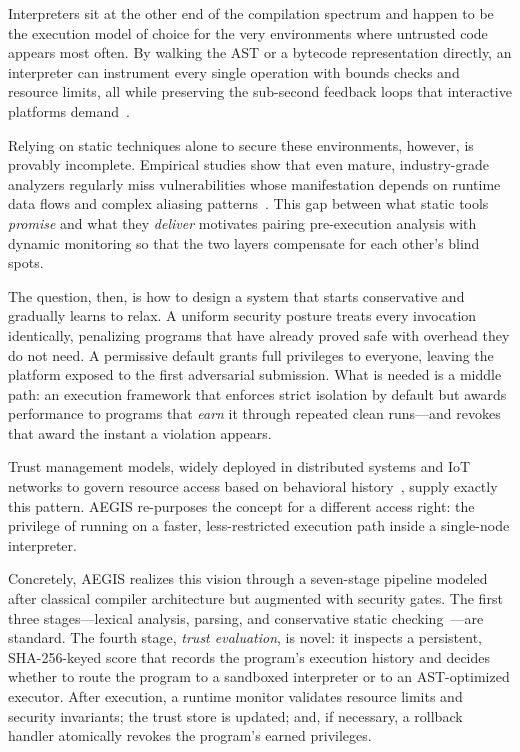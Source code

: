 \documentclass[conference]{IEEEtran}
\begin{document}
Interpreters sit at the other end of the compilation spectrum
and happen to be the execution model of choice for the very
environments where untrusted code appears most often.  By
walking the AST or a bytecode representation directly, an
interpreter can instrument every single operation with bounds
checks and resource limits, all while preserving the
sub-second feedback loops that interactive platforms
demand~\cite{aho2007compilers}.

Relying on static techniques alone to secure these environments,
however, is provably incomplete.  Empirical studies show that
even mature, industry-grade analyzers regularly miss
vulnerabilities whose manifestation depends on runtime data
flows and complex aliasing
patterns~\cite{ami2024false_neg,huang2024static}.  This gap
between what static tools \emph{promise} and what they
\emph{deliver} motivates pairing pre-execution analysis with
dynamic monitoring so that the two layers compensate for each
other's blind spots.

The question, then, is how to design a system that starts
conservative and gradually learns to relax.  A uniform security
posture treats every invocation identically, penalizing programs
that have already proved safe with overhead they do not need.
A permissive default grants full privileges to everyone,
leaving the platform exposed to the first adversarial
submission.  What is needed is a middle path: an execution
framework that enforces strict isolation by default but awards
performance to programs that \emph{earn} it through repeated
clean runs---and revokes that award the instant a violation
appears.

Trust management models, widely deployed in distributed systems
and IoT networks to govern resource access based on behavioral
history~\cite{wang2022trust,li2022iot_trust,ullah2024deeptrust},
supply exactly this pattern.  AEGIS re-purposes the concept for
a different access right: the privilege of running on a faster,
less-restricted execution path inside a single-node interpreter.

Concretely, AEGIS realizes this vision through a seven-stage
pipeline modeled after classical compiler architecture but
augmented with security gates.  The first three stages---lexical
analysis, parsing, and conservative static
checking~\cite{aho2007compilers}---are standard.  The fourth
stage, \emph{trust evaluation}, is novel: it inspects a
persistent, SHA-256-keyed score that records the program's
execution history and decides whether to route the program to
a sandboxed interpreter or to an AST-optimized executor.
After execution, a runtime monitor validates resource limits
and security invariants; the trust store is updated; and,
if necessary, a rollback handler atomically revokes the
program's earned privileges.
\end{document}
